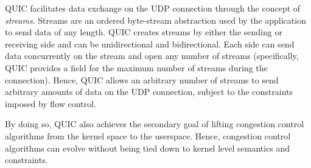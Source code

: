 QUIC facilitates data exchange on the UDP connection through the concept of \textit{streams}.
Streams are an ordered byte-stream abstraction used by the application to send data of any length.
QUIC creates streams by either the sending or receiving side and can be unidirectional and bidirectional.
Each side can send data concurrently on the stream and open any number of streams (specifically, QUIC provides a field for the maximum number of streams during the connection).
Hence, QUIC allows an arbitrary number of streams to send arbitrary amounts of data on the UDP connection, subject to the constraints imposed by flow control.

By doing so, QUIC also achieves the secondary goal of lifting congestion control algorithms from the kernel space to the userspace.
Hence, congestion control algorithms can evolve without being tied down to kernel level semantics and constraints.

